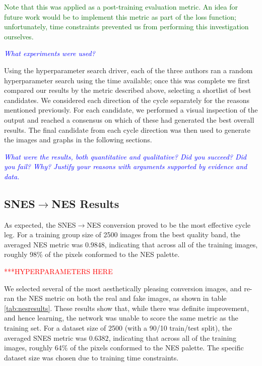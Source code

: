 \documentclass[10pt,twocolumn,letterpaper]{article}
\begin{document}
\textcolor{darkgreen}{Note that this was applied as a post-training evaluation metric. An idea for future work would be to implement this metric as part of the loss function; unfortunately, time constraints prevented us from performing this investigation ourselves.}

\textit{\textcolor{blue}{What experiments were used?}}

Using the hyperparameter search driver, each of the three authors ran a random hyperparameter search using the time available; once this was complete we first compared our results by the metric described above, selecting a shortlist of best candidates. We considered each direction of the cycle separately for the reasons mentioned previously. For each candidate, we performed a visual inspection of the output and reached a consensus on which of these had generated the best overall results. The final candidate from each cycle direction was then used to generate the images and graphs in the following sections.

\textit{\textcolor{blue}{What were the results, both quantitative and qualitative? Did you succeed? Did you fail? Why? Justify your reasons with arguments supported by evidence and data.}}

\subsection{SNES$\rightarrow$NES Results}

As expected, the SNES$\rightarrow$NES conversion proved to be the most effective cycle leg. For a training group size of 2500 images from the best quality band, the averaged NES metric was $0.9848$, indicating that across all of the training images, roughly 98\% of the pixels conformed to the NES palette.


\textcolor{red}{***HYPERPARAMETERS HERE}

We selected several of the most aesthetically pleasing conversion images, and re-ran the NES metric on both the real and fake images, as shown in table \ref{tab:nesresults}.
These results show that, while there was definite improvement, and hence learning, the network was unable to score the same metric as the training set. For a dataset size of 2500 (with a 90/10 train/test split), the averaged SNES metric was $0.6382$, indicating that across all of the training images, roughly 64\% of the pixels conformed to the NES palette. The specific dataset size was chosen due to training time constraints.
\end{document}
